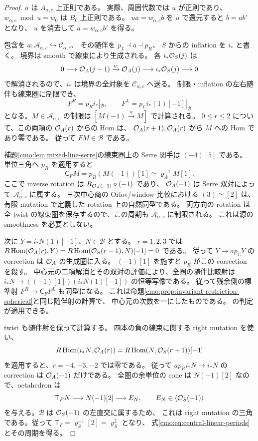 \begin{proof}
$u$ は $A_{\alpha,c}$ 上正則である。
実際、周囲代数では $u$ が正則であり、
$w_{\alpha,c}\bmod u=w_0$ は $B_0$ 上正則である。
$ua=w_{\alpha,c}b$ を $u$ で還元すると $b=ub'$ となり、
$u$ を消去して $a=w_{\alpha,c}b'$ を得る。

包含を $a:\mathcal A_{\alpha,c}\hookrightarrow\mathcal C_{\alpha,c}$、
その随伴を $p_L\dashv a\dashv p_R$、
$S$ からの inflation を $i_*$ と書く。
境界は smooth で線束により生成される。
各 $i_*\mathcal O_S(j)$ は
\[
 0\longrightarrow\mathcal O_A(j-1)\xrightarrow{u}\mathcal O_A(j)
       \longrightarrow i_*\mathcal O_S(j)\longrightarrow0
\]
で解消されるので、$i_*$ は境界の全対象を $\mathcal C_{\alpha,c}$ へ送る。
制限・inflation の左右随伴も線束圏に制限でき、
\[
 F^R=p_Ri_*|_{\mathcal B},\qquad
 F^L=p_Li_*(1)[-1]|_{\mathcal B}
\]
となる。$M\in\mathcal A_{\alpha,c}$ の制限は
$[M(-1)\xrightarrow{u}M]$ で計算される。
$0\le r\le2$ について、この両項の $\mathcal O_A(r)$ からの Hom は、
$\mathcal O_A(r+1),\mathcal O_A(r)$ から $M$ への Hom であり零である。
従って $FM\in\mathcal B$ である。

補題\ref{cmo:lem:mixed-line-serre}の線束圏上の Serre 関手は $(-4)[5]$ である。
単位三角へ $p_R$ を適用すると
\[
 \mathsf C_F M=p_R(M(-1))[1]\simeq\varrho_A^{-1}M[1].
\]
ここで inverse rotation は
$R_{\mathcal O_A(-1)}\circ(-1)$ であり、
$\mathcal O_A(-1)$ は Serre 双対によって $\mathcal A_{\alpha,c}^{\perp}$ に属する。
三次中心商の Orlov/window 比較における $(3)\simeq[2]$ は、
有限 mutation で定義した rotation 上の自然同型である。
両方向の rotation は全 twist の線束圏を保存するので、この周期も
$\mathcal A_{\alpha,c}$ に制限される。
これは源の smoothness を必要としない。

次に $Y=i_*N(1)[-1]$、$N\in\mathcal B$ とする。
$r=1,2,3$ では
$R\operatorname{Hom}(\mathcal O_A(r),Y)
 =R\operatorname{Hom}(\mathcal O_S(r-1),N)[-1]=0$ である。
従って $Y\to ap_LY$ の correction は $\mathcal O_A$ の生成圏に入る。
$(-1)[1]$ を施すと $p_R$ がこの correction を殺す。
中心元の二項解消とその双対の評価により、全圏の随伴比較射は
$i_*N\to(({-1})[1])(i_*N(1)[-1])$ の恒等写像である。
従って残余側の標準射 $F^R\to\mathsf C_FF^L$ も同型になる。
これは命題\ref{cmo:prop:invariant-restriction-spherical}と同じ随伴射の計算で、
中心元の次数を一にしたものである。
\cite[Theorem~5.1]{CMOAnnoLogvinenkoSpherical}の判定が適用できる。

twist も随伴射を保って計算する。
四本の負の線束に関する right mutation を使い、
\[
 R\operatorname{Hom}(i_*N,\mathcal O_A(r))
   =R\operatorname{Hom}(N,\mathcal O_S(r+1))[-1]
\]
を適用すると、$r=-4,-3,-2$ では零である。
従って $ap_Ri_*N\to i_*N$ の correction は $\mathcal O_A(-1)$ だけである。
全圏の余単位の cone は $N(-1)[2]$ なので、octahedron は
\[
 \mathsf T_FN\longrightarrow N(-1)[2]\longrightarrow E_N,\qquad
       E_N\in\langle\mathcal O_S(-1)\rangle
\]
を与える。$\mathcal B$ は $\mathcal O_S(-1)$ の左直交に属するため、
これは right mutation の三角である。従って
$\mathsf T_F=\varrho_S^{-1}[2]=\varrho_S^2$ となり、
式\eqref{cmo:eq:central-linear-periods}とその周期を得る。


\end{proof}
